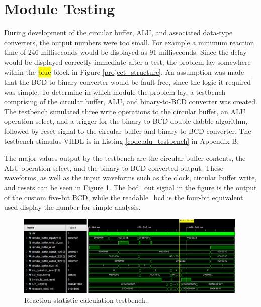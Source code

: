 \documentclass[11pt]{article}
\begin{document}

\section{Module Testing}


During development of the circular buffer, ALU, and associated data-type converters, the output numbers were too small. For example a minimum reaction time of 246 milliseconds would be displayed as 91 milliseconds. Since the delay would be displayed correctly immediate after a test, the problem lay somewhere within the \hl{blue} block in Figure \ref{project_structure}. An assumption was made that the BCD-to-binary converter would be fault-free, since the logic it required was simple. To determine in which module the problem lay, a testbench comprising of the circular buffer, ALU, and binary-to-BCD converter was created. The testbench simulated three write operations to the circular buffer, an ALU operation select, and a trigger for the binary to BCD double-dabble algorithm, followed by reset signal to the circular buffer and binary-to-BCD converter. The testbench stimulus VHDL is in Listing \ref{code:alu_testbench} in Appendix B.

The major values output by the testbench are the circular buffer contents, the ALU operation select, and the binary-to-BCD converted output. These waveforms, as well as the input waveforms such as the clock, circular buffer write, and resets can be seen in Figure \ref{fig:alu_testbench}. The bcd\_out signal in the figure is the output of the custom five-bit BCD, while the readable\_bcd is the four-bit equivalent used display the number for simple analysis.

\begin{figure}[H]
  \centering
  \includegraphics[width=0.99\textwidth]{thing.jpeg}
  \caption{Reaction statistic calculation testbench.}
  \label{fig:alu_testbench}
\end{figure}
\end{document}
